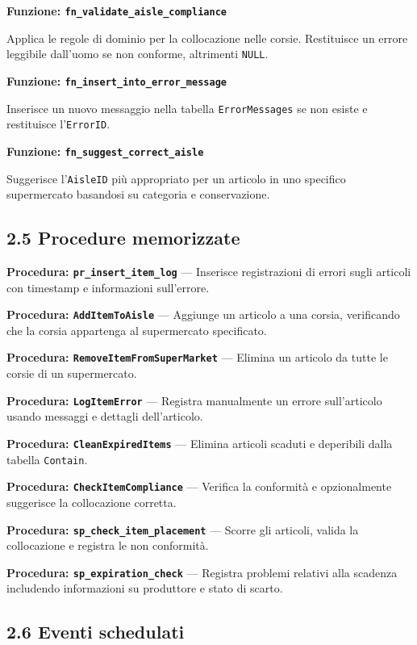 \documentclass[a4paper,12pt]{article}
\begin{document}
\textbf{Funzione: \texttt{fn\_validate\_aisle\_compliance}}

Applica le regole di dominio per la collocazione nelle corsie. Restituisce un errore leggibile dall’uomo se non conforme, altrimenti \texttt{NULL}.

\textbf{Funzione: \texttt{fn\_insert\_into\_error\_message}}

Inserisce un nuovo messaggio nella tabella \texttt{ErrorMessages} se non esiste e restituisce l’\texttt{ErrorID}.

\textbf{Funzione: \texttt{fn\_suggest\_correct\_aisle}}

Suggerisce l’\texttt{AisleID} più appropriato per un articolo in uno specifico supermercato basandosi su categoria e conservazione.

\subsection*{2.5 Procedure memorizzate}

\textbf{Procedura: \texttt{pr\_insert\_item\_log}} — Inserisce registrazioni di errori sugli articoli con timestamp e informazioni sull’errore.

\textbf{Procedura: \texttt{AddItemToAisle}} — Aggiunge un articolo a una corsia, verificando che la corsia appartenga al supermercato specificato.

\textbf{Procedura: \texttt{RemoveItemFromSuperMarket}} — Elimina un articolo da tutte le corsie di un supermercato.

\textbf{Procedura: \texttt{LogItemError}} — Registra manualmente un errore sull’articolo usando messaggi e dettagli dell’articolo.

\textbf{Procedura: \texttt{CleanExpiredItems}} — Elimina articoli scaduti e deperibili dalla tabella \texttt{Contain}.

\textbf{Procedura: \texttt{CheckItemCompliance}} — Verifica la conformità e opzionalmente suggerisce la collocazione corretta.

\textbf{Procedura: \texttt{sp\_check\_item\_placement}} — Scorre gli articoli, valida la collocazione e registra le non conformità.

\textbf{Procedura: \texttt{sp\_expiration\_check}} — Registra problemi relativi alla scadenza includendo informazioni su produttore e stato di scarto.

\subsection*{2.6 Eventi schedulati}
\end{document}
